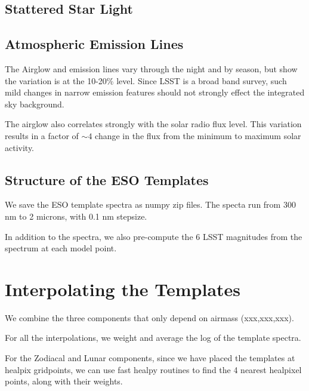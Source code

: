 \documentclass{emulateapj}  %
\begin{document}
\subsection{Stattered Star Light}



\subsection{Atmospheric Emission Lines}

The Airglow and emission lines vary through the night and by season, but \citet{Noll12} show the variation is at the 10-20\% level.  Since LSST is a broad band survey, such mild changes in narrow emission features should not strongly effect the integrated sky background.

The airglow also correlates strongly with the solar radio flux level.  This variation results in a factor of $\sim4$ change in the flux from the minimum to maximum solar activity.  





\subsection{Structure of the ESO Templates}

We save the ESO template spectra as numpy zip files.  The specta run from 300 nm to 2 microns, with 0.1 nm stepsize.

In addition to the spectra, we also pre-compute the 6 LSST magnitudes from the spectrum at each model point.

\section{Interpolating the Templates}

We combine the three components that only depend on airmass (xxx,xxx,xxx).

For all the interpolations, we weight and average the log of the template spectra.

For the Zodiacal and Lunar components, since we have placed the templates at healpix gridpoints, we can use fast healpy routines to find the 4 nearest healpixel points, along with their weights.  
\end{document}
